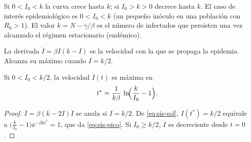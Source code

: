 \begin{remark}
Si $0<I_0<k$ la curva crece hasta $k$; si $I_0>k>0$ decrece hasta $k$. El caso de interés epidemiológico es $0<I_0<k$ (un pequeño inóculo en una población con $R_0>1$). El valor $k=N-\gamma/\beta$ es el número de infectados que persisten una vez alcanzado el régimen estacionario (endémico).
\end{remark}

La derivada $\dot I=\beta I(k-I)$ es la velocidad con la que se propaga la epidemia. Alcanza su máximo cuando $I=k/2$.

\begin{proposition}\label{prop:pico}
Si $0<I_0<k/2$, la velocidad $\dot I(t)$ es máxima en
\begin{equation}
  t^\ast=\frac{1}{k\beta}\,\ln\!\Bigl(\frac{k}{I_0}-1\Bigr).
  \label{eq:sis-pico}
\end{equation}
\end{proposition}

\begin{proof}
$\ddot I=\beta(k-2I)\dot I$ se anula si $I=k/2$. De \eqref{eq:sis-sol}, $I(t^\ast)=k/2$ equivale a $\bigl(\tfrac{k}{I_0}-1\bigr)\ee^{-\beta kt^\ast}=1$, que da \eqref{eq:sis-pico}. Si $I_0\ge k/2$, $\dot I$ es decreciente desde $t=0$.
\end{proof}

